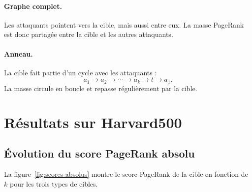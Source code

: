 \documentclass[12pt,a4paper]{article}
\theoremstyle{definition}
\begin{document}
\paragraph{Graphe complet.}
Les attaquants pointent vers la cible, mais aussi entre eux. La masse PageRank
est donc partagée entre la cible et les autres attaquants.

\paragraph{Anneau.}
La cible fait partie d'un cycle avec les attaquants :
\[
a_1 \to a_2 \to \cdots \to a_k \to t \to a_1.
\]
La masse circule en boucle et repasse régulièrement par la cible.

\section{Résultats sur Harvard500}

\subsection{Évolution du score PageRank absolu}

La figure~\ref{fig:scores-absolus} montre le score PageRank de la cible en
fonction de $k$ pour les trois types de cibles.
\end{document}
